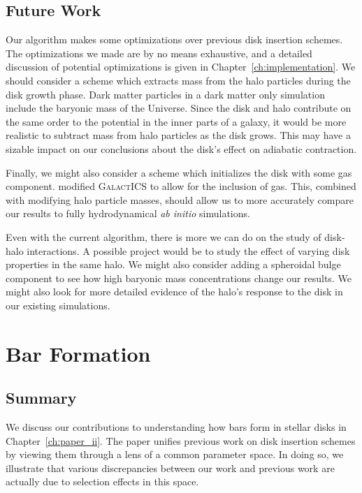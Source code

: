 \subsection{Future Work}

Our algorithm makes some optimizations over previous disk insertion schemes. The optimizations we made are by no means exhaustive, and a detailed discussion of potential optimizations is given in Chapter~\ref{ch:implementation}. We should consider a scheme which extracts mass from the halo particles during the disk growth phase. Dark matter particles in a dark matter only simulation include the baryonic mass of the Universe. Since the disk and halo contribute on the same order to the potential in the inner parts of a galaxy, it would be more realistic to subtract mass from halo particles as the disk grows. This may have a sizable impact on our conclusions about the disk's effect on adiabatic contraction.

Finally, we might also consider a scheme which initializes the disk with some gas component. \citet{deg_2019} modified \textsc{GalactICS} to allow for the inclusion of gas. This, combined with modifying halo particle masses, should allow us to more accurately compare our results to fully hydrodynamical \textit{ab initio} simulations.


Even with the current algorithm, there is more we can do on the study of disk-halo interactions. A possible project would be to study the effect of varying disk properties in the same halo. We might also consider adding a spheroidal bulge component to see how high baryonic mass concentrations change our results. We might also look for more detailed evidence of the halo's response to the disk in our existing simulations.


\section{Bar Formation}
\subsection{Summary}

We discuss our contributions to understanding how bars form in stellar disks in Chapter~\ref{ch:paper_ii}. The paper unifies previous work on disk insertion schemes by viewing them through a lens of a common parameter space. In doing so, we illustrate that various discrepancies between our work and previous work are actually due to selection effects in this space. 

